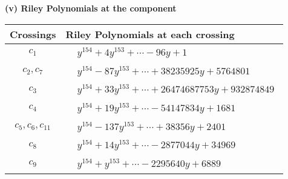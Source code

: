 \documentclass[1p]{elsarticle_modified}
\theoremstyle{definition}
\begin{document}
\newpage\renewcommand{\arraystretch}{1}
\flushleft \textbf{(v) Riley Polynomials at the component}\newline \\
\begin{tabular}{m{50pt}|m{274pt}}
Crossings & \hspace{64pt}Riley Polynomials at each crossing \\
\hline $$\begin{aligned}c_{1}\end{aligned}$$&$\begin{aligned}
&y^{154}+4 y^{153}+\cdots-96 y+1
\end{aligned}$\\
\hline $$\begin{aligned}c_{2},c_{7}\end{aligned}$$&$\begin{aligned}
&y^{154}-87 y^{153}+\cdots+38235925 y+5764801
\end{aligned}$\\
\hline $$\begin{aligned}c_{3}\end{aligned}$$&$\begin{aligned}
&y^{154}+33 y^{153}+\cdots+26474687753 y+932874849
\end{aligned}$\\
\hline $$\begin{aligned}c_{4}\end{aligned}$$&$\begin{aligned}
&y^{154}+19 y^{153}+\cdots-54147834 y+1681
\end{aligned}$\\
\hline $$\begin{aligned}c_{5},c_{6},c_{11}\end{aligned}$$&$\begin{aligned}
&y^{154}-137 y^{153}+\cdots+38356 y+2401
\end{aligned}$\\
\hline $$\begin{aligned}c_{8}\end{aligned}$$&$\begin{aligned}
&y^{154}+14 y^{153}+\cdots-2877044 y+34969
\end{aligned}$\\
\hline $$\begin{aligned}c_{9}\end{aligned}$$&$\begin{aligned}
&y^{154}+y^{153}+\cdots-2295640 y+6889
\end{aligned}$\\

\end{tabular}
\end{document}
